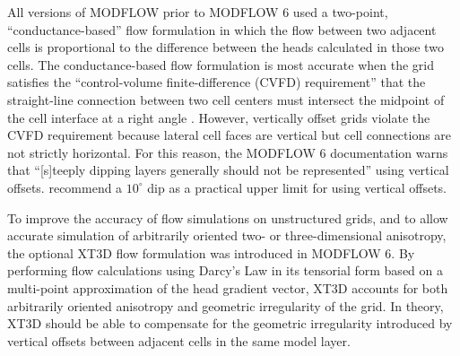 \documentclass{article}
\begin{document}
All versions of MODFLOW prior to MODFLOW 6 used a two-point, ``conductance-based'' flow formulation in which the flow between two adjacent cells is proportional to the difference between the heads calculated in those two cells. The conductance-based flow formulation is most accurate when the grid satisfies the ``control-volume finite-difference (CVFD) requirement'' that the straight-line connection between two cell centers must intersect the midpoint of the cell interface at a right angle \citep{narasimhan1976integrated}. However, vertically offset grids violate the CVFD requirement because lateral cell faces are vertical but cell connections are not strictly horizontal. For this reason, the MODFLOW 6 documentation \citep{modflow6gwf} warns that ``[s]teeply dipping layers generally should not be represented'' using vertical offsets. \cite{anderson2015applied} recommend a $10^{\circ}$ dip as a practical upper limit for using vertical offsets.

To improve the accuracy of flow simulations on unstructured grids, and to allow accurate simulation of arbitrarily oriented two- or three-dimensional anisotropy, the optional XT3D flow formulation \citep{modflow6xt3d} was introduced in MODFLOW 6. By performing flow calculations using Darcy's Law in its tensorial form based on a multi-point approximation of the head gradient vector, XT3D accounts for both arbitrarily oriented anisotropy and geometric irregularity of the grid. In theory, XT3D should be able to compensate for the geometric irregularity introduced by vertical offsets between adjacent cells in the same model layer.
\end{document}
